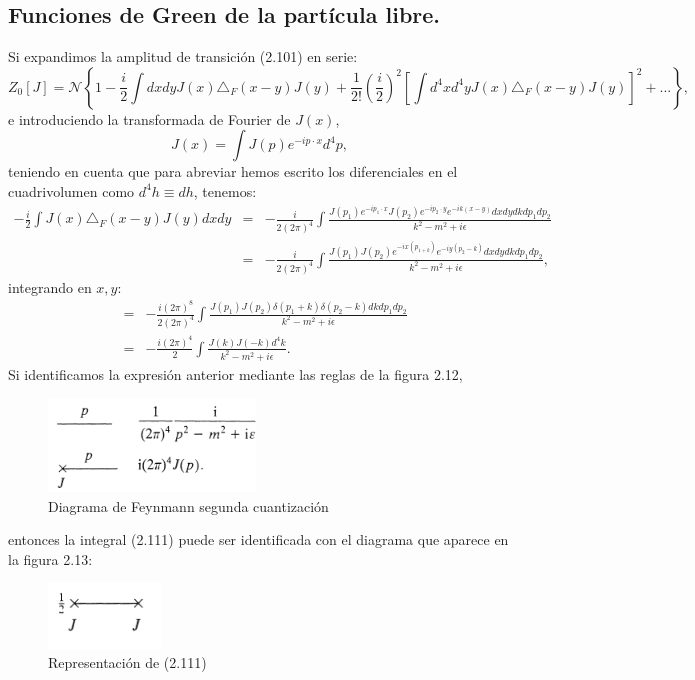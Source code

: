 \subsection{Funciones de Green de la partícula libre.}
Si expandimos la amplitud de transición (2.101) en serie:
\begin{equation}
Z_{0}[J]=\mathcal{N}\left\{ 1-\frac{i}{2}\int dxdyJ(x)\triangle_{F}(x-y)J(y)+\frac{1}{2!}\left(\frac{i}{2}\right)^{2}\left[\int d^{4}xd^{4}yJ(x)\triangle_{F}(x-y)J(y)\right]^{2}+...\right\},
\end{equation}
e introduciendo la transformada de Fourier de $J(x)$, 
\begin{equation}
J(x)=\int J(p)e^{-ip\cdot x}d^4p,
\end{equation}
teniendo en cuenta que para abreviar hemos escrito los diferenciales en el cuadrivolumen como $d^4h\equiv dh$, tenemos:
\begin{eqnarray}
\nonumber -\frac{i}{2}\int J(x)\triangle_F(x-y)J(y)dxdy&=&-\frac{i}{2(2\pi)^{4}}\int\frac{J(p_{1})e^{-ip_{1}\cdot x}J(p_{2})e^{-ip_{2}\cdot y}e^{-ik(x-y)}dxdydkdp_{1}dp_{2}}{k^{2}-m^{2}+i\epsilon}\\
\nonumber &=& -\frac{i}{2(2\pi)^{4}}\int\frac{J(p_{1})J(p_{2})e^{-ix(p_{1+k})}e^{-iy(p_{2}-k)}dxdydkdp_{1}dp_{2}}{k^{2}-m^{2}+i\epsilon},
\end{eqnarray}
integrando en $x,y$:
\begin{eqnarray}
\nonumber &=& -\frac{i(2\pi)^{8}}{2(2\pi)^{4}}\int\frac{J(p_{1})J(p_{2})\delta(p_{1}+k)\delta(p_{2}-k)dkdp_{1}dp_{2}}{k^{2}-m^{2}+i\epsilon}\\
&=& -\frac{i(2\pi)^{4}}{2}\int\frac{J(k)J(-k)d^{4}k}{k^{2}-m^{2}+i\epsilon}.
\end{eqnarray}
Si identificamos la expresión anterior mediante las reglas de la figura 2.12,
\begin{figure}
\caption[Diagrama de Feynmann segunda cuantización]{Diagrama de Feynmann segunda cuantización}
\includegraphics[width=5.5cm]{Imagenes/Fig12}
\end{figure}
entonces la integral (2.111) puede ser identificada con el diagrama que aparece en la figura 2.13:
\begin{figure}
\caption[Diagrama de Feynmann segunda cuantización]{Representación de (2.111)}
\includegraphics[width=3cm]{Imagenes/Fig13}
\end{figure}
